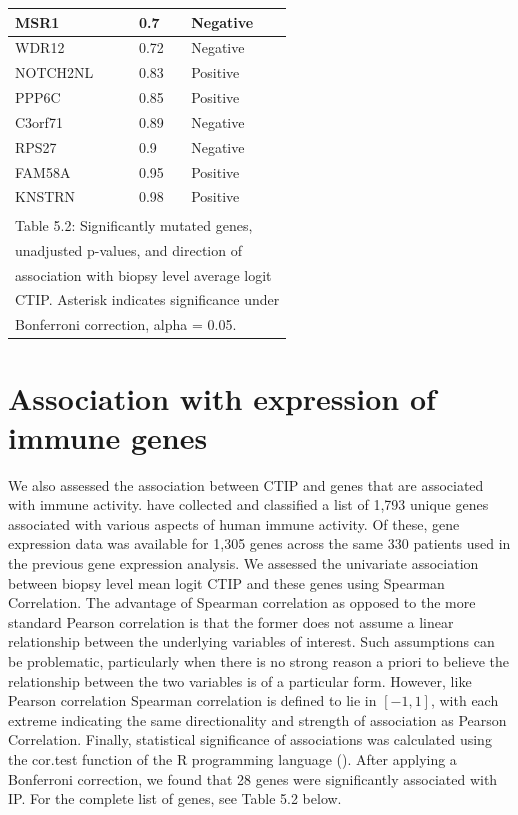 \documentclass[
]{book}
\begin{document}
\begin{tabular}{l|l|l}
\hline
MSR1 & 0.7 & Negative\\
\hline
WDR12 & 0.72 & Negative\\
\hline
NOTCH2NL & 0.83 & Positive\\
\hline
PPP6C & 0.85 & Positive\\
\hline
C3orf71 & 0.89 & Negative\\
\hline
RPS27 & 0.9 & Negative\\
\hline
FAM58A & 0.95 & Positive\\
\hline
KNSTRN & 0.98 & Positive\\
\hline
\multicolumn{3}{l}{\textsuperscript{} Table 5.2: Significantly mutated genes,}\\
\multicolumn{3}{l}{unadjusted p-values, and direction of}\\
\multicolumn{3}{l}{association with biopsy level average logit}\\
\multicolumn{3}{l}{CTIP. Asterisk indicates significance under}\\
\multicolumn{3}{l}{Bonferroni correction, alpha = 0.05.}\\
\end{tabular}

\hypertarget{association-with-expression-of-immune-genes}{%
\section{Association with expression of immune genes}\label{association-with-expression-of-immune-genes}}

We also assessed the association between CTIP and genes that are
associated with immune activity. \citet{Bhattacharya18} have collected and classified a list of 1,793 unique genes associated with various aspects of human immune activity. Of these, gene expression data was available for 1,305 genes across the same 330 patients used in the previous gene expression analysis. We assessed the univariate association between biopsy level mean logit CTIP and these genes using Spearman Correlation. The advantage of Spearman correlation as opposed to the more standard Pearson correlation is that the former does not assume a linear relationship between the underlying variables of interest. Such assumptions can be problematic, particularly when there is no strong reason a priori to believe the relationship between the two variables is of a particular form. However, like Pearson correlation Spearman correlation is defined to lie in \([-1,1]\), with each extreme indicating the same directionality and strength of association as Pearson Correlation. Finally, statistical significance of associations was calculated using the cor.test function of the R programming language (\citet{Rteam}). After applying a Bonferroni correction, we found that 28 genes were significantly associated with IP. For the complete list of genes, see Table 5.2 below.
\end{document}
